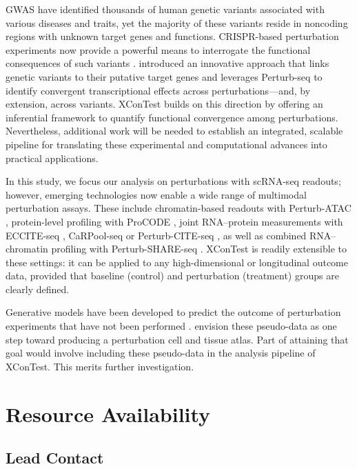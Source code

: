 \documentclass[11pt]{article}
\begin{document}
GWAS have identified thousands of human genetic variants associated with various diseases and traits, yet the majority of these variants reside in noncoding regions with unknown target genes and functions. CRISPR-based perturbation experiments now provide a powerful means to interrogate the functional consequences of such variants \citep{morris2023discovery}. \cite{schnitzler2024convergence} introduced an innovative approach that links genetic variants to their putative target genes and leverages Perturb-seq to identify convergent transcriptional effects across perturbations---and, by extension, across variants. XConTest builds on this direction by offering an inferential framework to quantify functional convergence among perturbations. Nevertheless, additional work will be needed to establish an integrated, scalable pipeline for translating these experimental and computational advances into practical applications.

In this study, we focus our analysis on perturbations with scRNA-seq readouts; however, emerging technologies now enable a wide range of multimodal perturbation assays. These include chromatin-based readouts with Perturb-ATAC \citep{adamson2016multiplexed}, protein-level profiling with ProCODE \citep{wroblewska2018protein}, joint RNA–protein measurements with ECCITE-seq \citep{Papalexi2021}, CaRPool-seq \citep{wessels2023efficient} or Perturb-CITE-seq \citep{Frangieh:2021}, as well as combined RNA–chromatin profiling with Perturb-SHARE-seq \citep{otto2023structural}. XConTest is readily extensible to these settings: it can be applied to any high-dimensional or longitudinal outcome data, provided that baseline (control) and perturbation (treatment) groups are clearly defined.

Generative models have been developed to predict the outcome of perturbation experiments that have not been performed \citep{GEARS,scGPT,shang2025predicting}.  \cite{rood2024toward} envision these pseudo-data as one step toward producing a perturbation cell and tissue atlas. Part of attaining that goal would involve including these pseudo-data in the analysis pipeline of XConTest.  This merits further investigation. 

\section*{Resource Availability}
\subsection*{Lead Contact}
\end{document}
